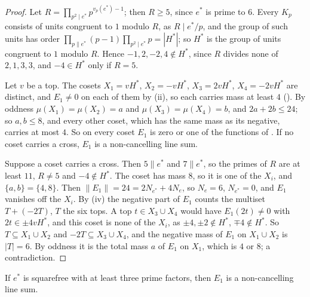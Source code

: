 \begin{proof}
Let $R=\prod_{p^{2}\mid e^{*}}p^{v_{p}(e^{*})-1}$; then $R\ge5$, since
$e^{*}$ is prime to $6$. Every $K_{p}$ consists of units congruent to $1$
modulo $R$, as $R\mid e^{*}/p$, and the group of such units has order
$\prod_{p\parallel e^{*}}(p-1)\prod_{p^{2}\mid e^{*}}p=|H^{*}|$; so $H^{*}$ is
the group of units congruent to $1$ modulo $R$. Hence $-1,2,-2,4\notin H^{*}$,
since $R$ divides none of $2,1,3,3$, and $-4\in H^{*}$ only if $R=5$.

Let $v$ be a top. The cosets $X_{1}=vH^{*}$, $X_{2}=-vH^{*}$, $X_{3}=2vH^{*}$,
$X_{4}=-2vH^{*}$ are distinct, and $E_{1}\ne0$ on each of them by
(ii), so each carries mass at least $4$ (). By
oddness $\mu(X_{1})=\mu(X_{2})=a$ and $\mu(X_{3})=\mu(X_{4})=b$, and
$2a+2b\le24$; so $a,b\le8$, and every other coset, which has the same mass as
its negative, carries at most $4$. So on every coset $E_{1}$ is zero or one of
the functions of . If no coset carries a cross, $E_{1}$ is a
non-cancelling line sum.

Suppose a coset carries a cross. Then $5\parallel e^{*}$ and $7\parallel
e^{*}$, so the primes of $R$ are at least $11$, $R\ne5$ and $-4\notin H^{*}$.
The coset has mass $8$, so it is one of the $X_{i}$, and $\{a,b\}=\{4,8\}$.
Then $\|E_{1}\|=24=2N_{e^{*}}+4N_{e}$, so $N_{e}=6$, $N_{e^{*}}=0$, and $E_{1}$
vanishes off the $X_{i}$. By (iv) the negative part of
$E_{1}$ counts the multiset $T+(-2T)$, $T$ the six tops. A top $t\in
X_{3}\cup X_{4}$ would have $E_{1}(2t)\ne0$ with $2t\in\pm4vH^{*}$, and this
coset is none of the $X_{i}$, as $\pm4,\pm2\notin H^{*}$, $\mp4\notin H^{*}$.
So $T\subseteq X_{1}\cup X_{2}$ and $-2T\subseteq X_{3}\cup X_{4}$, and the
negative mass of $E_{1}$ on $X_{1}\cup X_{2}$ is $|T|=6$. By oddness it is
the total mass $a$ of $E_{1}$ on $X_{1}$, which is $4$ or $8$; a
contradiction.
\end{proof}

\begin{proposition}\label{prop:threeprimes}
If $e^{*}$ is squarefree with at least three prime factors, then $E_{1}$ is
a non-cancelling line sum.
\end{proposition}

